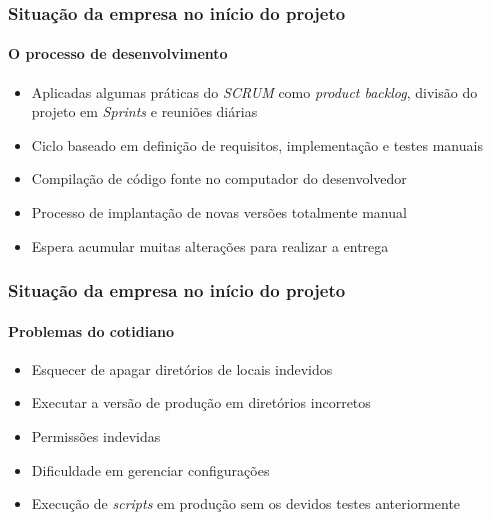 \documentclass[aspectratio=169]{beamer}
\begin{document}
\begin{frame}
	
	\frametitle{Situação da empresa no início do projeto}
	\framesubtitle{O processo de desenvolvimento}
	
	\begin{itemize}
		
		\item Aplicadas algumas práticas do \textit{SCRUM} como \textit{product backlog}, divisão do projeto em \textit{Sprints} e reuniões diárias
		
		\item Ciclo baseado em definição de requisitos, implementação e testes manuais
		
		\item Compilação de código fonte no computador do desenvolvedor
		
		\item Processo de implantação de novas versões totalmente manual
		
		\item Espera acumular muitas alterações para realizar a entrega
	\end{itemize}
	
\end{frame}


\begin{frame}
	
	\frametitle{Situação da empresa no início do projeto}
	\framesubtitle{Problemas do cotidiano}
	
	\begin{itemize}
		
		\item Esquecer de apagar diretórios de locais indevidos
		
		\item Executar a versão de produção em diretórios incorretos
		
		\item Permissões indevidas
		
		\item Dificuldade em gerenciar configurações
		
		\item Execução de \textit{scripts} em produção sem os devidos testes anteriormente
	\end{itemize}
	
\end{frame}
\end{document}
